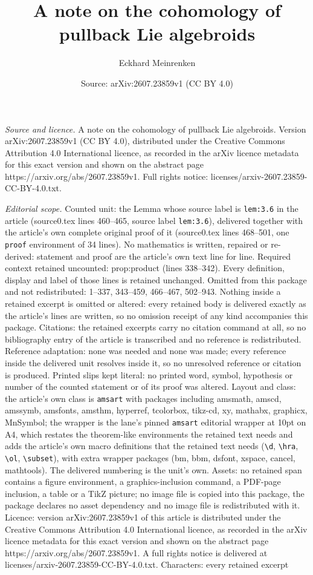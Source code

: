 \documentclass[10pt,a4paper]{amsart}
\title[A note on the cohomology of pullback Lie algebroids]{A note on the cohomology of pullback Lie algebroids}
\author{Eckhard Meinrenken}
\date{Source: arXiv:2607.23859v1 (CC BY 4.0)}
\begin{document}
\maketitle

\noindent\emph{Source and licence.} A note on the cohomology of pullback Lie algebroids. Version arXiv:2607.23859v1 (CC BY 4.0), distributed under the Creative Commons Attribution 4.0 International licence, as recorded in the arXiv licence metadata for this exact version and shown on the abstract page https://arxiv.org/abs/2607.23859v1. Full rights notice: licenses/arxiv-2607.23859-CC-BY-4.0.txt.\par\smallskip

\noindent\textit{Editorial scope.} Counted unit: the Lemma whose source label is \texttt{lem:3.6} in the article (source0.tex lines 460--465, source label \texttt{lem:3.6}), delivered together with the article's own complete original proof of it (source0.tex lines 468--501, one \texttt{proof} environment of 34 lines). No mathematics is written, repaired or re-derived: statement and proof are the article's own text line for line. Required context retained uncounted: prop:product (lines 338--342). Every definition, display and label of those lines is retained unchanged. Omitted from this package and not redistributed: 1--337, 343--459, 466--467, 502--943. Nothing inside a retained excerpt is omitted or altered: every retained body is delivered exactly as the article's lines are written, so no omission receipt of any kind accompanies this package. Citations: the retained excerpts carry no citation command at all, so no bibliography entry of the article is transcribed and no reference is redistributed. Reference adaptation: none was needed and none was made; every reference inside the delivered unit resolves inside it, so no unresolved reference or citation is produced. Printed slips kept literal: no printed word, symbol, hypothesis or number of the counted statement or of its proof was altered. Layout and class: the article's own class is \texttt{amsart} with packages including amsmath, amscd, amssymb, amsfonts, amsthm, hyperref, tcolorbox, tikz-cd, xy, mathabx, graphicx, MnSymbol; the wrapper is the lane's pinned \texttt{amsart} editorial wrapper at 10pt on A4, which restates the theorem-like environments the retained text needs and adds the article's own macro definitions that the retained text needs (\texttt{\textbackslash d}, \texttt{\textbackslash hra}, \texttt{\textbackslash ol}, \texttt{\textbackslash subset}), with extra wrapper packages (bm, bbm, dsfont, xspace, cancel, mathtools). The delivered numbering is the unit's own. Assets: no retained span contains a figure environment, a graphics-inclusion command, a PDF-page inclusion, a table or a TikZ picture; no image file is copied into this package, the package declares no asset dependency and no image file is redistributed with it. Licence: version arXiv:2607.23859v1 of this article is distributed under the Creative Commons Attribution 4.0 International licence, as recorded in the arXiv licence metadata for this exact version and shown on the abstract page https://arxiv.org/abs/2607.23859v1. A full rights notice is delivered at licenses/arxiv-2607.23859-CC-BY-4.0.txt. Characters: every retained excerpt 
\end{document}
